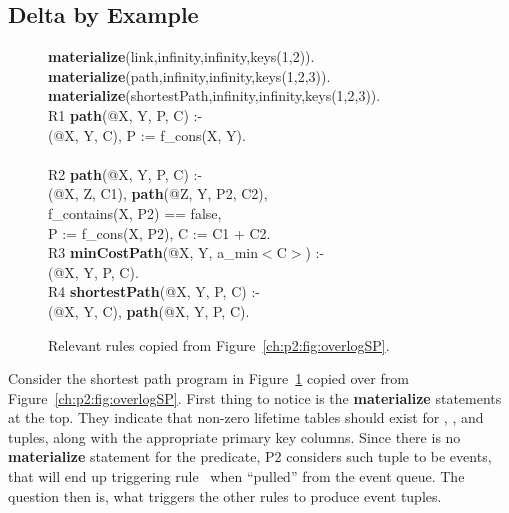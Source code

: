 \subsection{Delta by Example}

\begin{figure}[!t]
\ssp
\centering
\begin{boxedminipage}{\linewidth}
{\bf materialize}(link,infinity,infinity,keys(1,2)). \\
{\bf materialize}(path,infinity,infinity,keys(1,2,3)).  \\
{\bf materialize}(shortestPath,infinity,infinity,keys(1,2,3)). \\
  
R1 {\bf path}(@X, Y, P, C) :- \\
(@X, Y, C), P := f\_cons(X, Y). \\
\\
R2 {\bf path}(@X, Y, P, C) :- \\
(@X, Z, C1), {\bf path}(@Z, Y, P2, C2),\\
\datalogspace f\_contains(X, P2) == false, \\
\datalogspace P := f\_cons(X, P2), C := C1 + C2. \\

R3 {\bf minCostPath}(@X, Y, a\_min$<$C$>$) :-  \\
(@X, Y, P, C). \\ 

R4 {\bf shortestPath}(@X, Y, P, C) :- \\
(@X, Y, C), {\bf path}(@X, Y, P, C).

\end{boxedminipage}
\caption{\label{ch:evita:fig:basicSP}Relevant rules copied from Figure~\ref{ch:p2:fig:overlogSP}.}
\end{figure}

Consider the shortest path program in Figure~\ref{ch:evita:fig:basicSP} copied
over from Figure~\ref{ch:p2:fig:overlogSP}.  First thing to notice is the {\bf
materialize} statements at the top.  They indicate that non-zero lifetime
tables should exist for , , and  tuples,
along with the appropriate primary key columns.  Since there is no {\bf
materialize} statement for the  predicate, P2 considers such
tuple to be events, that will end up triggering rule~ when ``pulled''
from the event queue.  The question then is, what triggers the other rules to
produce  event tuples.


